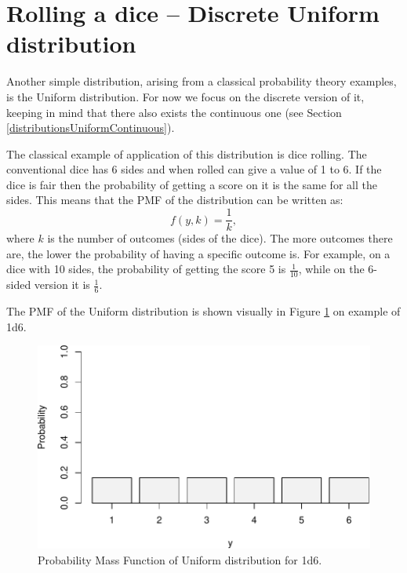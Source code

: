 \documentclass[
]{book}
\theoremstyle{definition}
\theoremstyle{definition}
\theoremstyle{definition}
\theoremstyle{definition}
\theoremstyle{remark}
\begin{document}
\hypertarget{distributionUniform}{%
\section{Rolling a dice -- Discrete Uniform distribution}\label{distributionUniform}}

Another simple distribution, arising from a classical probability theory examples, is the Uniform distribution. For now we focus on the discrete version of it, keeping in mind that there also exists the continuous one (see Section \ref{distributionsUniformContinuous}).

The classical example of application of this distribution is dice rolling. The conventional dice has 6 sides and when rolled can give a value of 1 to 6. If the dice is fair then the probability of getting a score on it is the same for all the sides. This means that the PMF of the distribution can be written as:
\begin{equation}
    f(y, k) = \frac{1}{k},
    \label{eq:UniformPMF}
\end{equation}
where \(k\) is the number of outcomes (sides of the dice). The more outcomes there are, the lower the probability of having a specific outcome is. For example, on a dice with 10 sides, the probability of getting the score 5 is \(\frac{1}{10}\), while on the 6-sided version it is \(\frac{1}{6}\).

The PMF of the Uniform distribution is shown visually in Figure \ref{fig:uniformPMF} on example of 1d6.

\begin{figure}
\centering
\includegraphics{Svetunkov---Statistics-for-Business-Analytics_files/figure-latex/uniformPMF-1.pdf}
\caption{\label{fig:uniformPMF}Probability Mass Function of Uniform distribution for 1d6.}
\end{figure}
\end{document}
